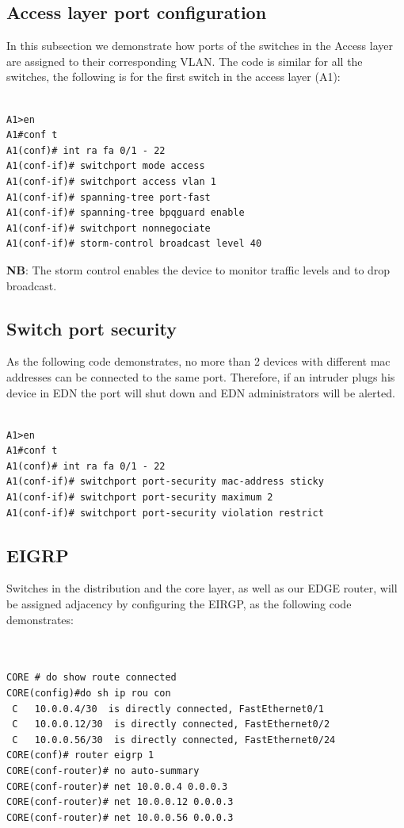 \documentclass[ a4, 12pt, onecolumn]{IEEEtran}
\begin{document}
\subsection{Access layer port configuration}
In this subsection we demonstrate how ports of the switches in the Access layer are assigned to their corresponding VLAN. The code is similar for all the switches, the following is for the first switch in the access layer (A1):
\begin{center}
\begin{lstlisting}

A1>en    
A1#conf t
A1(conf)# int ra fa 0/1 - 22
A1(conf-if)# switchport mode access 
A1(conf-if)# switchport access vlan 1
A1(conf-if)# spanning-tree port-fast
A1(conf-if)# spanning-tree bpqguard enable
A1(conf-if)# switchport nonnegociate
A1(conf-if)# storm-control broadcast level 40
\end{lstlisting}
\end{center}
\textbf{NB}: The storm control enables the device to monitor traffic levels and to drop broadcast. 
\subsection{Switch port security}
As the following code demonstrates, no more than 2 devices with different mac addresses can be connected to the same port. Therefore, if an intruder plugs his device in EDN the port will shut down and EDN administrators will be alerted.

\begin{center}
\begin{lstlisting}

A1>en    
A1#conf t
A1(conf)# int ra fa 0/1 - 22
A1(conf-if)# switchport port-security mac-address sticky
A1(conf-if)# switchport port-security maximum 2
A1(conf-if)# switchport port-security violation restrict 
\end{lstlisting}
\end{center}

\subsection{EIGRP}
Switches in the distribution and the core layer, as well as our EDGE router, will be assigned adjacency by configuring the EIRGP, as the following code demonstrates:
\begin{center}
\begin{lstlisting}


CORE # do show route connected
CORE(config)#do sh ip rou con
 C   10.0.0.4/30  is directly connected, FastEthernet0/1
 C   10.0.0.12/30  is directly connected, FastEthernet0/2
 C   10.0.0.56/30  is directly connected, FastEthernet0/24
CORE(conf)# router eigrp 1
CORE(conf-router)# no auto-summary
CORE(conf-router)# net 10.0.0.4 0.0.0.3
CORE(conf-router)# net 10.0.0.12 0.0.0.3
CORE(conf-router)# net 10.0.0.56 0.0.0.3
\end{lstlisting}
\end{center}
\end{document}
